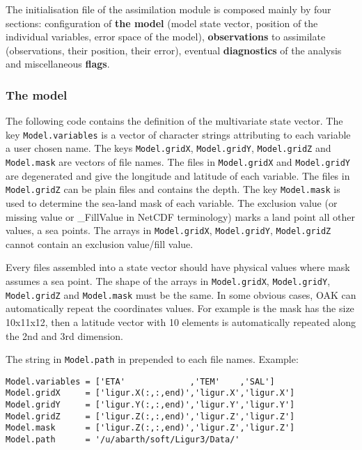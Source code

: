 \documentclass[a4paper,12pt]{article}
\newcommand{\code}{\texttt}
\begin{document}
The initialisation file of the assimilation module is composed mainly
by four sections: configuration of \textbf{the model} (model state vector,
position of the individual variables, error space of the model),
\textbf{observations} to assimilate (observations, their position, their
error), eventual \textbf{diagnostics} of the analysis and
miscellaneous \textbf{flags}.

\subsubsection{The model}

The following code contains the definition of the multivariate state
vector. The key \code{Model.variables} is a vector of character
strings attributing to each variable a user chosen name. The keys
\code{Model.gridX}, \code{Model.gridY}, \code{Model.gridZ} and
\code{Model.mask} are vectors of file names. The files in \code{Model.gridX} and 
\code{Model.gridY} are degenerated and give the longitude and latitude
of each variable. The files in \code{Model.gridZ} can be plain files
and contains the depth. The key \code{Model.mask} is used to determine
the sea-land mask of each variable. The exclusion value (or missing
value or \_FillValue in NetCDF terminology) marks a land point all other values, a sea
points. The arrays in \code{Model.gridX}, \code{Model.gridY}, \code{Model.gridZ} cannot 
contain an exclusion value/fill value.

Every files assembled into a state vector should have physical
values where mask assumes a sea point. The shape of the arrays in
\code{Model.gridX}, \code{Model.gridY}, \code{Model.gridZ} and
\code{Model.mask} must be the same. In some obvious cases, OAK can automatically repeat the coordinates values. For example is the mask has the size 10x11x12, then a latitude vector with 10 elements is automatically repeated along the 2nd and 3rd dimension.



The string in \code{Model.path} in prepended to each file names.
Example:


\begin{verbatim}
Model.variables = ['ETA'             ,'TEM'    ,'SAL'] 
Model.gridX     = ['ligur.X(:,:,end)','ligur.X','ligur.X'] 
Model.gridY     = ['ligur.Y(:,:,end)','ligur.Y','ligur.Y'] 
Model.gridZ     = ['ligur.Z(:,:,end)','ligur.Z','ligur.Z'] 
Model.mask      = ['ligur.Z(:,:,end)','ligur.Z','ligur.Z'] 
Model.path      = '/u/abarth/soft/Ligur3/Data/' 
\end{verbatim}
\end{document}
